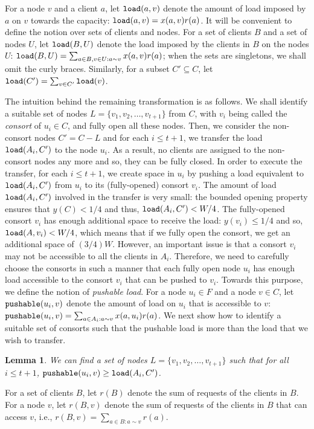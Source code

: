 \documentclass[11pt]{article}
\newtheorem{lemma}[theorem]{Lemma}
\newcommand{\load} {{\tt load}}
\newcommand{\push} {{\tt pushable}}
\begin{document}
For a node $v$ and a client $a$, let $\load(a, v)$ denote the amount of load imposed by $a$ on $v$ towards the capacity:
$\load(a, v) = x(a, v)r(a)$. It will be convenient to define the notion over sets of clients and nodes.
For a set of clients $B$ and a set of nodes $U$, let $\load(B, U)$ denote the load imposed by the clients
in $B$ on the nodes $U$: $\load(B, U) =\sum_{a\in B, v\in U:a\sim v}x(a,v)r(a)$;
when the sets are singletons, we shall omit the curly braces.
Similarly, for a subset $C'\subseteq C$, let $\load(C') = \sum_{v\in C'} \load(v)$.

The intuition behind the remaining transformation is as follows.
We shall identify a suitable set of nodes $L=\{v_1, v_2, \ldots, v_{t+1}\}$ from $C$,
with $v_i$ being called the {\em consort} of $u_i \in C$, and fully open all these nodes.
Then, we consider the non-consort nodes $C'=C-L$ and for each $i\leq t+1$, we transfer the load $\load(A_i, C')$ to the node $u_i$.
As a result, no clients are assigned to the non-consort nodes any more and so, they can be fully closed.
In order to execute the transfer, for each $i\leq t+1$, we create space in $u_i$ by pushing a load equivalent to $\load(A_i, C')$ 
from $u_i$ to its (fully-opened) consort $v_i$.
The  amount of load $\load(A_i, C')$ involved in the transfer is very small:
the bounded opening property ensures that $y(C) < 1/4$ and thus, $\load(A_i, C') < W/4$.
The fully-opened consort $v_i$ has enough additional space to receive the load:
$y(v_i)\leq 1/4$ and so, $\load(A, v_i) < W/4$, which means that if we fully open the consort, 
we get an additional space of $(3/4)W$.
However, an important issue is that a consort $v_i$ may not be accessible to all the clients in $A_i$.
Therefore, we need to carefully choose the consorts in such a manner that each 
fully open node $u_i$ has enough load accessible to the consort $v_i$
that can be pushed to $v_i$. 
Towards this purpose, we define the notion of {\em pushable load}.
For a node $u_i\in F$ and a node $v\in C$, let $\push(u_i, v)$ denote the amount of load on $u_i$ that is accessible to 
$v$:  $\push(u_i, v) = \sum_{a\in A_i:a\sim v} x(a, u_i)r(a)$. We next show how to identify a suitable set of consorts
such that the pushable load is more than the load that we wish to transfer. 

\begin{lemma}
\label{lem:io-AAA}
We can find a set of nodes $L=\{v_1, v_2, \ldots, v_{t+1}\}$ such that for all $i\leq t+1$, $\push(u_i, v) \geq \load(A_i, C')$. 
\end{lemma}
\proof
For a set of clients $B$, let $r(B)$ denote the sum of requests of the clients in $B$. For a node $v$, let $r(B,v)$ denote the sum of requests of the clients in $B$ that can access $v$, i.e.,
$r(B, v) = \sum_{a\in B:a\sim v} r(a)$.
\end{document}
